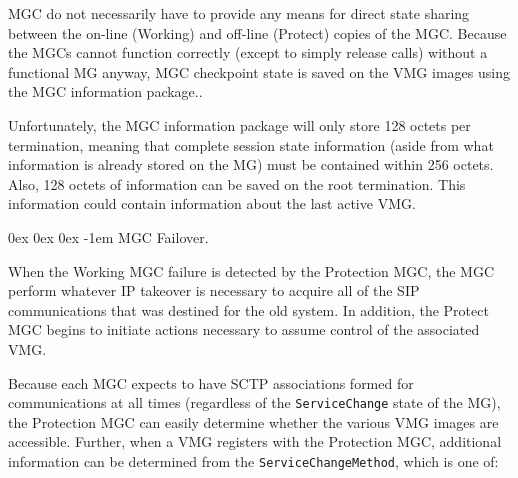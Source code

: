 \documentclass[letterpaper,final,notitlepage,twocolumn,10pt,twoside]{article}
\makeatletter
\let\normalsize = \small
\let\small = \footnotesize
\let\footnotesize = \scriptsize
\let\scriptsize = \tiny
\renewcommand\subparagraph{\@startsection{subparagraph}{5}{\parindent}%
                                       {0ex \@plus 0ex \@minus 0ex}%
                                       {-1em}%
                                      {\normalfont\normalsize\bfseries\slshape}}
\makeatother
\begin{document}
MGC do not necessarily have to provide any means for direct state sharing
between the on-line (Working) and off-line (Protect) copies of the MGC.
Because the MGCs cannot function correctly (except to simply release calls)
without a functional MG anyway, MGC checkpoint state is saved on the VMG
images using the MGC information package.\cite[]{H24845}.
      
Unfortunately, the MGC information package will only store 128 octets per
termination, meaning that complete session state information (aside from what
information is already stored on the MG) must be contained within 256 octets.
Also, 128 octets of information can be saved on the root termination.  This
information could contain information about the last active VMG.

\subparagraph{MGC Failover.}

When the Working MGC failure is detected by the Protection MGC, the MGC
perform whatever IP takeover is necessary to acquire all of the SIP
communications that was destined for the old system.  In addition, the Protect
MGC begins to initiate actions necessary to assume control of the associated
VMG.

Because each MGC expects to have SCTP associations formed for communications
at all times (regardless of the {\tt ServiceChange} state of the MG), the
Protection MGC can easily determine whether the various VMG images are
accessible.  Further, when a VMG registers with the Protection MGC, additional
information can be determined from the {\tt ServiceChangeMethod}, which is one
of:
\end{document}
